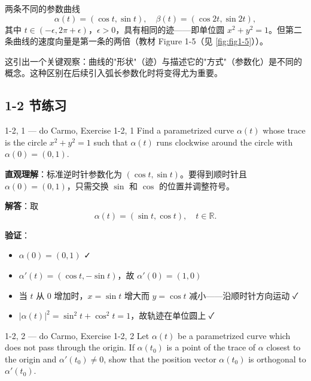 \begin{Example}[相同迹的不同参数化]\label{ex:same-trace-different-param}
两条不同的参数曲线
\[
\alpha(t) = (\cos t, \sin t),\quad \beta(t) = (\cos 2t, \sin 2t),
\]
其中 $t \in (-\epsilon, 2\pi + \epsilon)$，$\epsilon > 0$，具有相同的迹——即单位圆 $x^2 + y^2 = 1$。但第二条曲线的速度向量是第一条的两倍（教材 Figure 1-5（见 \cref{fig:fig1-5}））。

这引出一个关键观察：曲线的"形状"（迹）与描述它的"方式"（参数化）是不同的概念。这种区别在后续引入弧长参数化时将变得尤为重要。
\end{Example}

\subsection*{1-2 节练习}

\begin{exercise}{1-2, 1 — do Carmo, Exercise 1-2, 1}
Find a parametrized curve $\alpha(t)$ whose trace is the circle $x^2 + y^2 = 1$ such that $\alpha(t)$ runs clockwise around the circle with $\alpha(0) = (0, 1)$.
\end{exercise}

\begin{solution}
\textbf{直观理解}：标准逆时针参数化为 $(\cos t, \sin t)$。要得到顺时针且 $\alpha(0) = (0, 1)$，只需交换 $\sin$ 和 $\cos$ 的位置并调整符号。

\textbf{解答}：取
\[
\alpha(t) = (\sin t, \cos t), \quad t \in \mathbb{R}.
\]

\textbf{验证}：
\begin{itemize}
\item $\alpha(0) = (0, 1)$ ✓
\item $\alpha'(t) = (\cos t, -\sin t)$，故 $\alpha'(0) = (1, 0)$
\item 当 $t$ 从 $0$ 增加时，$x = \sin t$ 增大而 $y = \cos t$ 减小——沿顺时针方向运动 ✓
\item $|\alpha(t)|^2 = \sin^2 t + \cos^2 t = 1$，故轨迹在单位圆上 ✓
\end{itemize}
\end{solution}

\begin{exercise}{1-2, 2 — do Carmo, Exercise 1-2, 2}
Let $\alpha(t)$ be a parametrized curve which does not pass through the origin. If $\alpha(t_0)$ is a point of the trace of $\alpha$ closest to the origin and $\alpha'(t_0) \neq 0$, show that the position vector $\alpha(t_0)$ is orthogonal to $\alpha'(t_0)$.
\end{exercise}

